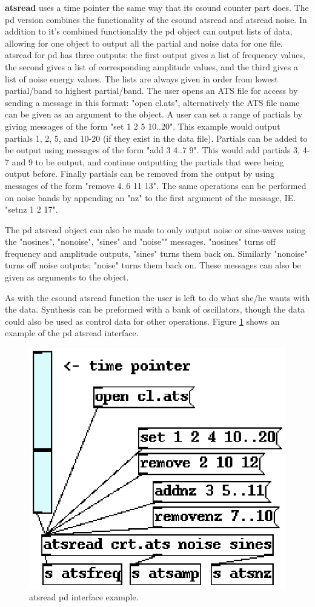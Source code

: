 \documentclass[10pt,letterpaper]{article}
\begin{document}
\textbf{atsread} uses a time pointer the same way that its csound counter part does.  The pd version combines the functionality of the csound atsread and atsread noise.  In addition to it's combined functionality the pd object can output lists of data, allowing for one object to output all the partial and noise data for one file.  atsread for pd has three outputs: the first output gives a list of frequency values, the second gives a list of corresponding amplitude values, and the third gives a list of noise energy values.  The lists are always given in order from lowest partial/band to highest partial/band.  The user opens an ATS file for access by sending a message in this format: "open cl.ats", alternatively the ATS file name can be given as an argument to the object.  A user can set a range of partials by giving messages of the form "set 1 2 5 10..20".  This example would output partials 1, 2, 5, and 10-20 (if they exist in the data file).  Partials can be added to be output using messages of the form "add 3 4..7 9".  This would add partials 3, 4-7 and 9 to be output, and continue outputting the partials that were being output before.  Finally partials can be removed from the output by using messages of the form "remove 4..6 11 13".  The same operations can be performed on noise bands by appending an "nz" to the first argument of the message, IE. "setnz 1 2 17".

The pd atsread object can also be made to only output noise or sine-waves using the "nosines", "nonoise", "sines" and "noise"" messages.  "nosines" turns off frequency and amplitude outputs, "sines" turns them back on.  Similarly "nonoise" turns off noise outputs; "noise" turns them back on.  These messages can also be given as arguments to the object.

As with the csound atsread function the user is left to do what she/he wants with the data.  Synthesis can be preformed with a bank of oscillators, though the data could also be used as control data for other operations.  Figure \ref{ats-pd} shows an example of the pd atsread interface.


\begin{figure}[htb]
	\begin{center}
	\includegraphics{ats-pd-example.eps}
	\caption{atsread pd interface example.}
	\label{ats-pd}
	\end{center}
\end{figure}
\end{document}
